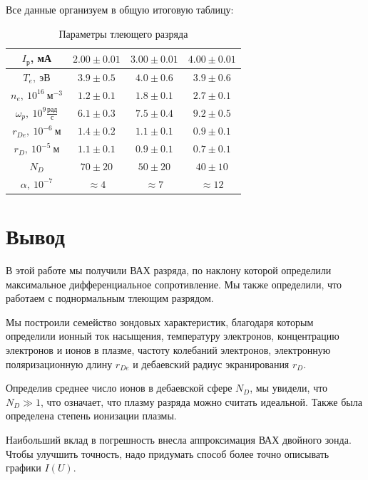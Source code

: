 \documentclass[a4paper]{article}
\begin{document}
Все данные организуем в общую итоговую таблицу:

\begin{table}[h!]
	\centering
	\begin{tabular}{|c|c|c|c|}
		\hline
		$I_{\text{р}}$, мА & $2.00\pm0.01$ & $3.00\pm0.01$ & $4.00\pm0.01$ \\ \hline
		$T_e,\ \text{эВ}$ & $3.9\pm0.5$ & $4.0\pm0.6$ & $3.9\pm0.6$ \\ \hline
		$n_e,\ 10^{16}~\text{м}^{-3}$ & $1.2\pm0.1$ & $1.8\pm0.1$ & $2.7\pm0.1$ \\ \hline
		$\omega_p,\ 10^9\frac{\text{рад}}{\text{с}}$ & $6.1\pm0.3$ & $7.5\pm0.4$ & $9.2\pm0.5$ \\ \hline
        $r_{De}, \ 10^{-6}~\text{м}$ & $1.4\pm0.2$ & $1.1\pm0.1$ & $0.9\pm0.1$ \\ \hline
		$r_{D},  \ 10^{-5}~\text{м}$ & $1.1\pm0.1$ & $0.9\pm0.1$ & $0.7\pm0.1$ \\ \hline
		$N_D$ & $70\pm20$ & $50\pm20$ & $40\pm10$ \\ \hline
		$\alpha,\ 10^{-7}$ & $\approx 4$ & $\approx 7$ & $\approx 12$ \\ \hline
	\end{tabular}
    \caption{Параметры тлеющего разряда} \label{Electrons}
\end{table}

\newpage

\section{Вывод}

В этой работе мы получили ВАХ разряда,
по наклону которой определили максимальное дифференциальное сопротивление.
Мы также определили, что работаем с поднормальным тлеющим разрядом.

Мы построили семейство зондовых характеристик, благодаря которым определили
ионный ток насыщения, температуру электронов, концентрацию электронов и ионов в плазме,
частоту колебаний электронов, электронную поляризационную длину $r_{De}$ и дебаевский радиус экранирования $r_D$.

Определив среднее число ионов в дебаевской сфере $N_D$, мы увидели, что $N_D \gg 1$, что означает, 
что плазму разряда можно считать идеальной. Также была определена степень ионизации плазмы.

Наибольший вклад в погрешность внесла аппроксимация ВАХ двойного зонда. 
Чтобы улучшить точность, надо придумать способ более точно описывать графики $I(U)$.
\end{document}
